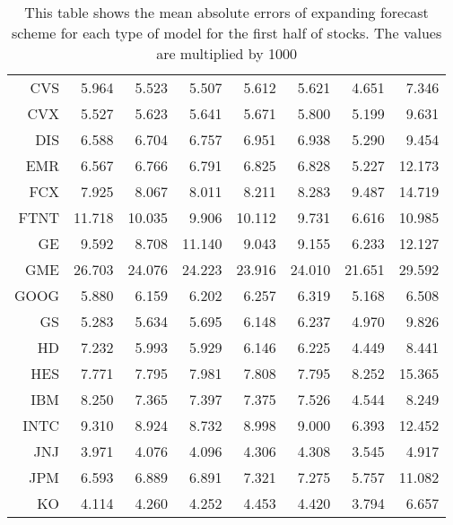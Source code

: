 \begin{table}[ht]
\begin{tabular}{rrrrrrrr}
  CVS & 5.964 & 5.523 & 5.507 & 5.612 & 5.621 & 4.651 & 7.346 \\ 
  CVX & 5.527 & 5.623 & 5.641 & 5.671 & 5.800 & 5.199 & 9.631 \\ 
  DIS & 6.588 & 6.704 & 6.757 & 6.951 & 6.938 & 5.290 & 9.454 \\ 
  EMR & 6.567 & 6.766 & 6.791 & 6.825 & 6.828 & 5.227 & 12.173 \\ 
  FCX & 7.925 & 8.067 & 8.011 & 8.211 & 8.283 & 9.487 & 14.719 \\ 
  FTNT & 11.718 & 10.035 & 9.906 & 10.112 & 9.731 & 6.616 & 10.985 \\ 
  GE & 9.592 & 8.708 & 11.140 & 9.043 & 9.155 & 6.233 & 12.127 \\ 
  GME & 26.703 & 24.076 & 24.223 & 23.916 & 24.010 & 21.651 & 29.592 \\ 
  GOOG & 5.880 & 6.159 & 6.202 & 6.257 & 6.319 & 5.168 & 6.508 \\ 
  GS & 5.283 & 5.634 & 5.695 & 6.148 & 6.237 & 4.970 & 9.826 \\ 
  HD & 7.232 & 5.993 & 5.929 & 6.146 & 6.225 & 4.449 & 8.441 \\ 
  HES & 7.771 & 7.795 & 7.981 & 7.808 & 7.795 & 8.252 & 15.365 \\ 
  IBM & 8.250 & 7.365 & 7.397 & 7.375 & 7.526 & 4.544 & 8.249 \\ 
  INTC & 9.310 & 8.924 & 8.732 & 8.998 & 9.000 & 6.393 & 12.452 \\ 
  JNJ & 3.971 & 4.076 & 4.096 & 4.306 & 4.308 & 3.545 & 4.917 \\ 
  JPM & 6.593 & 6.889 & 6.891 & 7.321 & 7.275 & 5.757 & 11.082 \\ 
  KO & 4.114 & 4.260 & 4.252 & 4.453 & 4.420 & 3.794 & 6.657 \\ 
   \hline
\end{tabular}
\caption[MAE expanding forecast (1)]{This table shows the mean absolute errors of expanding forecast scheme for each type of model for the first half of stocks. 
                     The values are multiplied by 1000} 
\label{Table:MAE_e_1}
\end{table}
